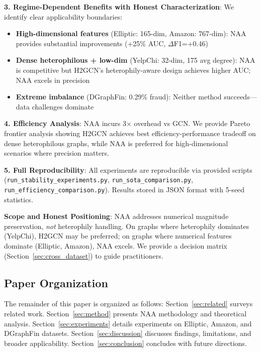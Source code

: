\textbf{3. Regime-Dependent Benefits with Honest Characterization}: We identify clear applicability boundaries:
\begin{itemize}
\item \textbf{High-dimensional features} (Elliptic: 165-dim, Amazon: 767-dim): NAA provides substantial improvements (+25\% AUC, $\Delta$F1=+0.46)
\item \textbf{Dense heterophilous + low-dim} (YelpChi: 32-dim, 175 avg degree): NAA is competitive but H2GCN's heterophily-aware design achieves higher AUC; NAA excels in precision
\item \textbf{Extreme imbalance} (DGraphFin: 0.29\% fraud): Neither method succeeds---data challenges dominate
\end{itemize}

\textbf{4. Efficiency Analysis}: NAA incurs 3$\times$ overhead vs GCN. We provide Pareto frontier analysis showing H2GCN achieves best efficiency-performance tradeoff on dense heterophilous graphs, while NAA is preferred for high-dimensional scenarios where precision matters.

\textbf{5. Full Reproducibility}: All experiments are reproducible via provided scripts (\texttt{run\_stability\_experiments.py}, \texttt{run\_sota\_comparison.py}, \texttt{run\_efficiency\_comparison.py}). Results stored in JSON format with 5-seed statistics.

\textbf{Scope and Honest Positioning}: NAA addresses numerical magnitude preservation, \textit{not} heterophily handling. On graphs where heterophily dominates (YelpChi), H2GCN may be preferred; on graphs where numerical features dominate (Elliptic, Amazon), NAA excels. We provide a decision matrix (Section~\ref{sec:cross_dataset}) to guide practitioners.

\subsection{Paper Organization}

The remainder of this paper is organized as follows: Section~\ref{sec:related} surveys related work. Section~\ref{sec:method} presents NAA methodology and theoretical analysis. Section~\ref{sec:experiments} details experiments on Elliptic, Amazon, and DGraphFin datasets. Section~\ref{sec:discussion} discusses findings, limitations, and broader applicability. Section~\ref{sec:conclusion} concludes with future directions.
